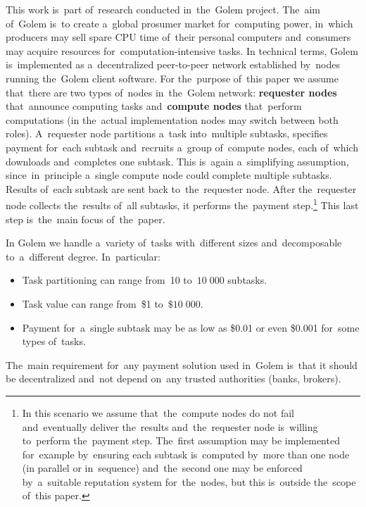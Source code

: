 \documentclass[a4paper]{article}
\begin{document}
    This work  is~part of~research conducted in~the~Golem project. The~aim of~Golem  is~to create a~global prosumer
    market for~computing power, in~which producers may sell spare CPU time of~their personal computers and~consumers
    may acquire resources for~computation-intensive tasks. In technical terms, Golem  is~implemented as a~decentralized
    peer-to-peer network established by~nodes running the~Golem client software. For the~purpose of~this paper
    we assume that~there are two types of~nodes in~the~Golem network: \textbf{requester nodes} that~announce computing
    tasks and~\textbf{compute nodes} that~perform computations (in the~actual implementation nodes may switch between
    both roles).
    A~requester node partitions a~task into~multiple subtasks, specifies payment for~each subtask and~recruits
    a~group of~compute nodes, each of~which downloads and~completes one subtask. This  is~again a~simplifying
    assumption, since~in~principle a~single compute node could complete multiple subtasks.
    Results of~each subtask are sent back to~the~requester node. After the~requester node collects the~results of~all
    subtasks, it performs the~payment step.\footnote{In this scenario we assume that~the~compute nodes do not fail
    and~eventually deliver the~results and~the~requester node  is~willing to~perform the~payment step.
    The~first assumption may be implemented for~example by~ensuring each subtask is~computed by~more than one node
    (in parallel or in~sequence) and~the~second one may be enforced by~a~suitable reputation system for~the~nodes,
    but this  is~outside the~scope of~this paper.} This last step  is~the~main focus of~the~paper.

    In Golem we handle a~variety of~tasks with~different sizes and~decomposable to~a~different degree. In~particular:
    \begin{itemize}
        \item Task partitioning can range from~10 to~$10\;000$ subtasks.
        \item Task value can range from~\$1 to~$\$10\;000$.
        \item Payment for~a~single subtask may be as low as \$0.01 or even \$0.001 for~some types of~tasks.
    \end{itemize}

    The~main requirement for~any payment solution used in~Golem  is~that it should be decentralized and~not depend
    on~any trusted authorities (banks, brokers).
\end{document}
